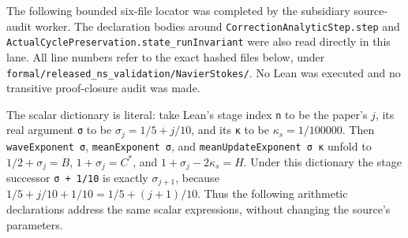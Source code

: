 \documentclass[10pt,a4paper]{article}
\begin{document}
The following bounded six-file locator was completed by the subsidiary source-audit worker. The declaration bodies around \texttt{C\allowbreak{}o\allowbreak{}r\allowbreak{}r\allowbreak{}e\allowbreak{}c\allowbreak{}t\allowbreak{}i\allowbreak{}o\allowbreak{}n\allowbreak{}A\allowbreak{}n\allowbreak{}a\allowbreak{}l\allowbreak{}y\allowbreak{}t\allowbreak{}i\allowbreak{}c\allowbreak{}S\allowbreak{}t\allowbreak{}e\allowbreak{}p\allowbreak{}.\allowbreak{}s\allowbreak{}t\allowbreak{}e\allowbreak{}p} and \texttt{A\allowbreak{}c\allowbreak{}t\allowbreak{}u\allowbreak{}a\allowbreak{}l\allowbreak{}C\allowbreak{}y\allowbreak{}c\allowbreak{}l\allowbreak{}e\allowbreak{}P\allowbreak{}r\allowbreak{}e\allowbreak{}s\allowbreak{}e\allowbreak{}r\allowbreak{}v\allowbreak{}a\allowbreak{}t\allowbreak{}i\allowbreak{}o\allowbreak{}n\allowbreak{}.\allowbreak{}s\allowbreak{}t\allowbreak{}a\allowbreak{}t\allowbreak{}e\allowbreak{}\_\allowbreak{}r\allowbreak{}u\allowbreak{}n\allowbreak{}I\allowbreak{}n\allowbreak{}v\allowbreak{}a\allowbreak{}r\allowbreak{}i\allowbreak{}a\allowbreak{}n\allowbreak{}t} were also read directly in this lane. All line numbers refer to the exact hashed files below, under \texttt{f\allowbreak{}o\allowbreak{}r\allowbreak{}m\allowbreak{}a\allowbreak{}l\allowbreak{}/\allowbreak{}r\allowbreak{}e\allowbreak{}l\allowbreak{}e\allowbreak{}a\allowbreak{}s\allowbreak{}e\allowbreak{}d\allowbreak{}\_\allowbreak{}n\allowbreak{}s\allowbreak{}\_\allowbreak{}v\allowbreak{}a\allowbreak{}l\allowbreak{}i\allowbreak{}d\allowbreak{}a\allowbreak{}t\allowbreak{}i\allowbreak{}o\allowbreak{}n\allowbreak{}/\allowbreak{}N\allowbreak{}a\allowbreak{}v\allowbreak{}i\allowbreak{}e\allowbreak{}r\allowbreak{}S\allowbreak{}t\allowbreak{}o\allowbreak{}k\allowbreak{}e\allowbreak{}s\allowbreak{}/}. No Lean was executed and no transitive proof-closure audit was made.

The scalar dictionary is literal: take Lean's stage index \texttt{n} to be the paper's \(j\), its real argument \texttt{σ} to be \(\sigma_j=1/5+j/10\), and its \texttt{κ} to be \(\kappa_s=1/100000\). Then \texttt{waveExponent\ σ}, \texttt{meanExponent\ σ}, and \texttt{m\allowbreak{}e\allowbreak{}a\allowbreak{}n\allowbreak{}U\allowbreak{}p\allowbreak{}d\allowbreak{}a\allowbreak{}t\allowbreak{}e\allowbreak{}E\allowbreak{}x\allowbreak{}p\allowbreak{}o\allowbreak{}n\allowbreak{}e\allowbreak{}n\allowbreak{}t\allowbreak{}\ \allowbreak{}σ\allowbreak{}\ \allowbreak{}κ} unfold to \(1/2+\sigma_j=B\), \(1+\sigma_j=C^*\), and \(1+\sigma_j-2\kappa_s=H\). Under this dictionary the stage successor \texttt{σ\ +\ 1/10} is exactly \(\sigma_{j+1}\), because \(1/5+j/10+1/10=1/5+(j+1)/10\). Thus the following arithmetic declarations address the same scalar expressions, without changing the source's parameters.
\end{document}
